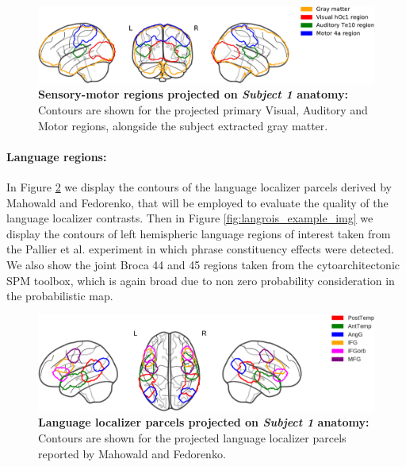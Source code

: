 \begin{figure}[hptb]
\centering
\includegraphics[width=1.0 \linewidth]{figures/part_II/sensory_example_img_with_legend.pdf}
\caption{\textbf{Sensory-motor regions projected on \emph{Subject 1} anatomy:}
Contours are shown for the projected primary Visual, Auditory and Motor regions, alongside the subject extracted gray matter.
}
\label{fig:sensory_example_img}
\end{figure}


\paragraph{Language regions:}
In Figure \ref{fig:fedorenko_example_img} we display the contours of the language localizer parcels derived by Mahowald and Fedorenko\citep{mahowald2016reliable}, that will be employed to evaluate the quality of the language localizer contrasts.
Then in Figure \ref{fig:langrois_example_img} we display the contours of left hemispheric language regions of interest taken from the Pallier et al. experiment in which phrase constituency effects were detected\citep{pallier2011cortical}.
We also show the joint Broca 44 and 45 regions taken from the cytoarchitectonic SPM toolbox\citep{eickhoff2005new}, which is again broad due to non zero probability consideration in the probabilistic map.


\begin{figure}[hptb]
\centering
\includegraphics[width=1.0 \linewidth]{figures/part_II/fedorenko_example_img_with_legend.pdf}
\caption{\textbf{Language localizer parcels projected on \emph{Subject 1} anatomy:}
Contours are shown for the projected language localizer parcels reported by Mahowald and Fedorenko.
}
\label{fig:fedorenko_example_img}
\end{figure}


